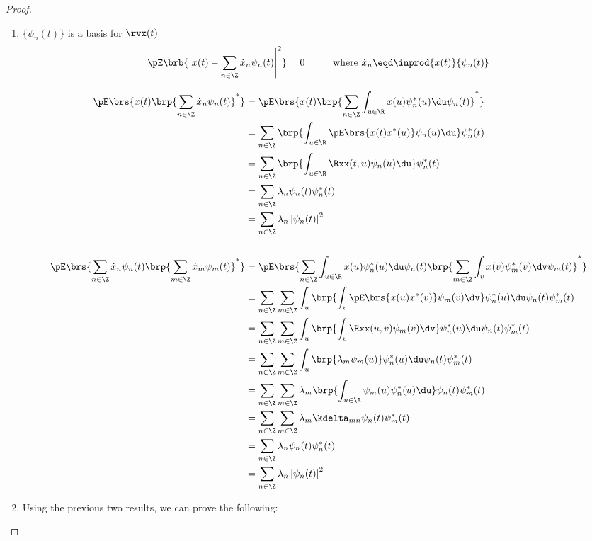 \begin{proof}
\begin{enumerate}
\item $\{\psi_n(t)\}$ is a basis for $\rvx(t)$
      \[ \pE\brb{\left| x(t)-\sum_{n\in\Z}\dot{x}_n \psi_n(t) \right|^2} = 0
         \hspace{1cm}\mbox{where } \dot{x}_n\eqd \inprod{x(t)}{\psi_n(t)}
      \]

\begin{align*}
   \pE\brs{x(t) \brp{\sum_{n\in\Z}\dot{x}_n \psi_n(t)}^\ast}
     &= \pE\brs{x(t) \brp{\sum_{n\in\Z}\int_{u\in\R}x(u)\psi_n^\ast(u)\du \psi_n(t)}^\ast}
   \\&= \sum_{n\in\Z}\brp{\int_{u\in\R}\pE\brs{x(t)x^\ast(u)}\psi_n(u)\du} \psi_n^\ast(t)
   \\&= \sum_{n\in\Z}\brp{\int_{u\in\R}\Rxx(t,u)\psi_n(u)\du} \psi_n^\ast(t)
   \\&= \sum_{n\in\Z}\lambda_n\psi_n(t) \psi_n^\ast(t)
   \\&= \sum_{n\in\Z}\lambda_n \left|\psi_n(t) \right|^2
\\ \\
   \pE\brs{\sum_{n\in\Z}\dot{x}_n \psi_n(t)\brp{\sum_{m\in\Z}\dot{x}_m \psi_m(t)}^\ast}
     &= \pE\brs{\sum_{n\in\Z}\int_{u\in\R}x(u)\psi_n^\ast(u)\du   \psi_n(t)\brp{\sum_{m\in\Z}\int_v x(v)\psi_m^\ast(v)\dv \psi_m(t)}^\ast}
   \\&= \sum_{n\in\Z}\sum_{m\in\Z}\int_u\brp{\int_v \pE\brs{x(u)x^\ast(v)}\psi_m(v)\dv} \psi_n^\ast(u)\du   \psi_n(t)   \psi_m^\ast(t)
   \\&= \sum_{n\in\Z}\sum_{m\in\Z}\int_u\brp{\int_v \Rxx(u,v)\psi_m(v)\dv} \psi_n^\ast(u)\du   \psi_n(t)   \psi_m^\ast(t)
   \\&= \sum_{n\in\Z}\sum_{m\in\Z}\int_u\brp{\lambda_m\psi_m(u)} \psi_n^\ast(u)\du   \psi_n(t)   \psi_m^\ast(t)
   \\&= \sum_{n\in\Z}\sum_{m\in\Z}\lambda_m \brp{\int_{u\in\R}\psi_m(u) \psi_n^\ast(u)\du }   \psi_n(t)   \psi_m^\ast(t)
   \\&= \sum_{n\in\Z}\sum_{m\in\Z}\lambda_m \kdelta_{mn}   \psi_n(t)   \psi_m^\ast(t)
   \\&= \sum_{n\in\Z}\lambda_n   \psi_n(t)   \psi_n^\ast(t)
   \\&= \sum_{n\in\Z}\lambda_n  \left| \psi_n(t) \right|^2
\end{align*}


\item Using the previous two results, we can prove the following:


\end{enumerate}
\end{proof}
